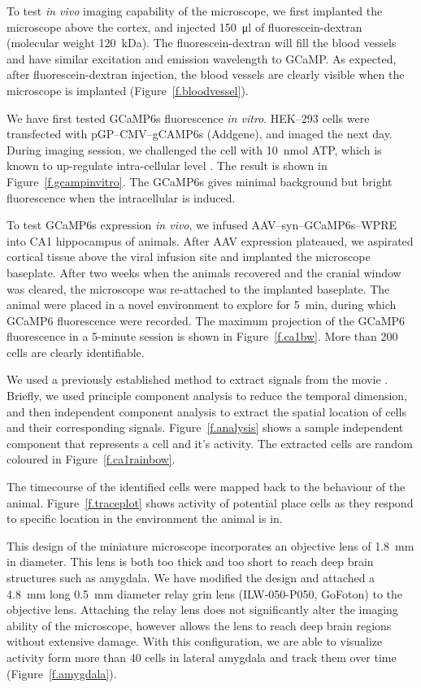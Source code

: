 To test \textit{in vivo} imaging capability of the microscope, we first implanted the microscope above the cortex, and injected \SI{150}{\ul} of fluorescein-dextran (molecular weight \SI{120}{\kilo\dalton}). The fluorescein-dextran will fill the blood vessels and have similar excitation and emission wavelength to GCaMP. As expected, after fluorescein-dextran injection, the blood vessels are clearly visible when the microscope is implanted (Figure~\ref{f.bloodvessel}).

We have first tested GCaMP6s fluorescence \textit{in vitro}. HEK--293 cells were transfected with pGP--CMV--gCAMP6s (Addgene), and imaged the next day. During imaging session, we challenged the cell with \SI{10}{\nmol} ATP, which is known to up-regulate intra-cellular  level \citep[\textit{e.g.}][]{lee04}. The result is shown in Figure~\ref{f.gcampinvitro}. The GCaMP6s gives minimal background but bright fluorescence when the intracellular  is induced.

To test GCaMP6s expression \textit{in vivo}, we infused AAV--syn--GCaMP6s--WPRE into CA1 hippocampus of animals. After AAV expression plateaued, we aspirated cortical tissue above the viral infusion site and implanted the microscope baseplate. After two weeks when the animals recovered and the cranial window was cleared, the microscope was re-attached to the implanted baseplate. The animal were placed in a novel environment to explore for \SI{5}{\minute}, during which GCaMP6 fluorescence were recorded. The maximum projection of the GCaMP6 fluorescence in a 5-minute session is shown in Figure~\ref{f.ca1bw}. More than 200 cells are clearly identifiable.

We used a previously established method to extract  signals from the movie \citep{mukamel09}. Briefly, we used principle component analysis to reduce the temporal dimension, and then independent component analysis to extract the spatial location of cells and their corresponding  signals. Figure~\ref{f.analysis} shows a sample independent component that represents a cell and it's activity. The extracted cells are random coloured in Figure~\ref{f.ca1rainbow}.   

The timecourse of the identified cells were mapped back to the behaviour of the animal. Figure~\ref{f.traceplot} shows  activity of potential place cells as they respond to specific location in the environment the animal is in.

This design of the miniature microscope incorporates an objective lens of \SI{1.8}{\mm} in diameter. This lens is both too thick and too short to reach deep brain structures such as amygdala. We have modified the design and attached a \SI{4.8}{\mm} long \SI{0.5}{\mm} diameter relay \gls{grin} lens (ILW-050-P050, GoFoton) to the objective lens. Attaching the relay lens does not significantly alter the imaging ability of the microscope, however allows the lens to reach deep brain regions without extensive damage. With this configuration, we are able to visualize activity form more than 40 cells in lateral amygdala and track them over time (Figure~\ref{f.amygdala}).


